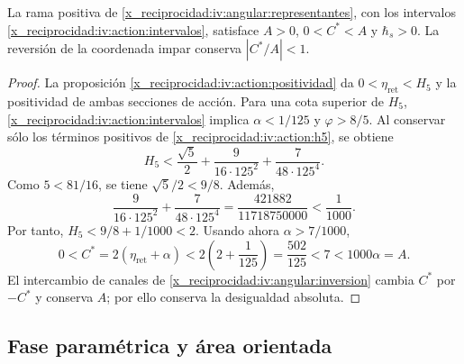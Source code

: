 \begin{proposition}
\label{x_reciprocidad:iv:ellipse:pertenencia}
La rama positiva de \eqref{x_reciprocidad:iv:angular:representantes}, con los
intervalos \eqref{x_reciprocidad:iv:action:intervalos}, satisface
\(A>0\), \(0<C^*<A\) y \(\hbar_s>0\).
La reversión de la coordenada impar conserva \(|C^*/A|<1\).
\end{proposition}
\begin{proof}
La proposición \ref{x_reciprocidad:iv:action:positividad} da
\(0<\eta_{\mathrm{ret}}<H_5\) y la positividad de ambas
secciones de acción. Para una cota superior de \(H_5\),
\eqref{x_reciprocidad:iv:action:intervalos} implica
\(\alpha<1/125\) y \(\varphi>8/5\). Al conservar sólo
los términos positivos de \eqref{x_reciprocidad:iv:action:h5}, se obtiene
\[
 H_5<
 \frac{\sqrt5}{2}+
 \frac{9}{16\cdot125^2}+
 \frac{7}{48\cdot125^4}.
\]
Como \(5<81/16\), se tiene \(\sqrt5/2<9/8\). Además,
\[
 \frac{9}{16\cdot125^2}+
 \frac{7}{48\cdot125^4}
 =\frac{421882}{11718750000}<\frac1{1000}.
\]
Por tanto, \(H_5<9/8+1/1000<2\). Usando ahora
\(\alpha>7/1000\),
\[
 0<C^*=2(\eta_{\mathrm{ret}}+\alpha)
 <2\left(2+\frac1{125}\right)=\frac{502}{125}
 <7<1000\alpha=A.
\]
El intercambio de canales de
\ref{x_reciprocidad:iv:angular:inversion} cambia \(C^*\) por \(-C^*\)
y conserva \(A\); por ello conserva la desigualdad absoluta.
\end{proof}

\subsection{Fase paramétrica y área orientada}
\label{x_reciprocidad:iv:ellipse:area}

